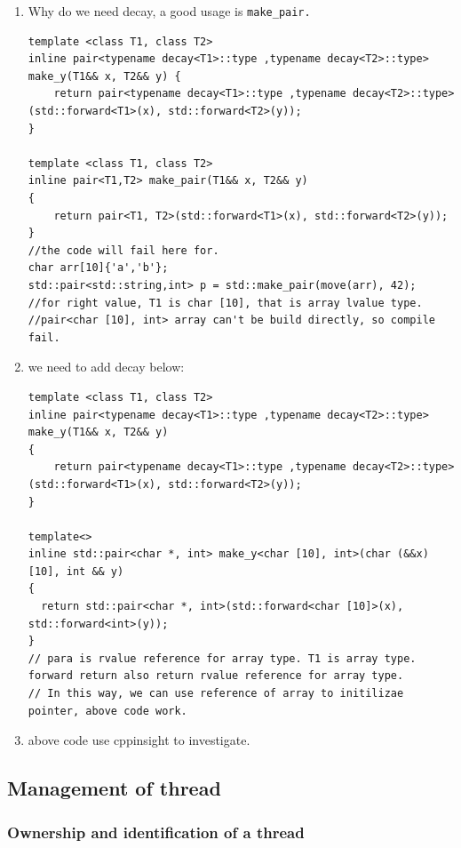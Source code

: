 \documentclass[a4paper,11pt,twoside]{book}
\begin{document}
\begin{itemize}
\begin{enumerate}
		\item Why do we need decay, a good usage is \texttt{make\_pair.}
\begin{lstlisting}
template <class T1, class T2> 
inline pair<typename decay<T1>::type ,typename decay<T2>::type> make_y(T1&& x, T2&& y) { 
    return pair<typename decay<T1>::type ,typename decay<T2>::type>(std::forward<T1>(x), std::forward<T2>(y)); 
}

template <class T1, class T2> 
inline pair<T1,T2> make_pair(T1&& x, T2&& y)
{ 
    return pair<T1, T2>(std::forward<T1>(x), std::forward<T2>(y)); 
}
//the code will fail here for.  
char arr[10]{'a','b'};
std::pair<std::string,int> p = std::make_pair(move(arr), 42);
//for right value, T1 is char [10], that is array lvalue type.
//pair<char [10], int> array can't be build directly, so compile fail.
\end{lstlisting}

		\item we need to add decay below:
\begin{lstlisting}
template <class T1, class T2>
inline pair<typename decay<T1>::type ,typename decay<T2>::type> make_y(T1&& x, T2&& y)
{
    return pair<typename decay<T1>::type ,typename decay<T2>::type>(std::forward<T1>(x), std::forward<T2>(y));
}

template<>
inline std::pair<char *, int> make_y<char [10], int>(char (&&x)[10], int && y)
{
  return std::pair<char *, int>(std::forward<char [10]>(x), std::forward<int>(y));
}
// para is rvalue reference for array type. T1 is array type. forward return also return rvalue reference for array type.
// In this way, we can use reference of array to initilizae pointer, above code work.
\end{lstlisting}

		\item above code use cppinsight to investigate. 
		\end{enumerate}

\end{itemize}


\subsection{Management of thread}
\subsubsection{Ownership and identification of a thread}
\end{document}
